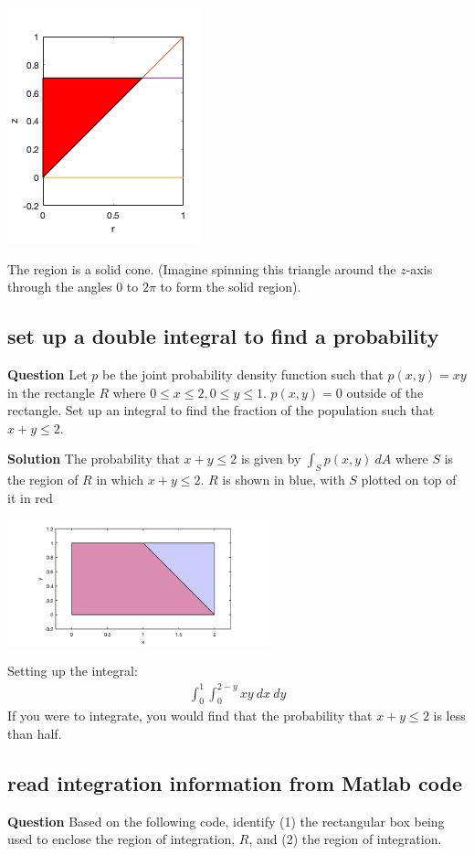 \documentclass[12pt,letterpaper,noanswers]{exam}
\begin{document}
\includegraphics[scale=0.5]{img/C13skill.png}

The region is a solid cone.  (Imagine spinning this triangle around the $z$-axis through the angles $0$ to $2\pi$ to form the solid region).

\subsection{set up a double integral to find a probability}
\noindent\textbf{Question}
 Let $p$ be the joint probability density function such that $p(x,y) = xy$ in the rectangle $R$ where $0\leq x \leq 2, 0\leq y\leq 1$.  $p(x,y) =0$ outside of the rectangle.  Set up an integral to find the fraction of the population such that $x+y \leq 2$.
 
\noindent\textbf{Solution}
The probability that $x+y \leq 2$ is given by $\int_S p(x,y)\ dA$ where $S$ is the region of $R$ in which $x+y\leq 2$.  $R$ is shown in blue, with $S$ plotted on top of it in red 

\includegraphics[width=3in]{img/C15skillcheck.png}

Setting up the integral:
\begin{align*}
   \int_0^1 \int_0^{2-y}xy\ dx\ dy
\end{align*}
If you were to integrate, you would find that the probability that $x+y\leq 2$ is less than half.

\subsection{read integration information from Matlab code}
\noindent\textbf{Question}
Based on the following code, identify (1) the rectangular box being used to enclose the region of integration, $R$, and (2) the region of integration.
\end{document}
